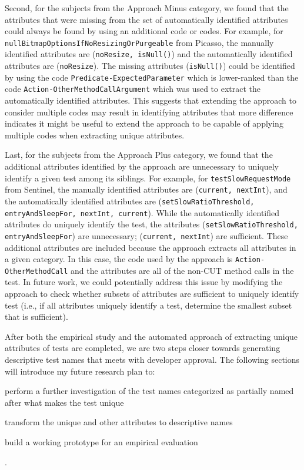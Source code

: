 Second, for the subjects from the Approach Minus category, we found that the attributes that were missing from the set of automatically identified attributes could always be found by using an additional code or codes.
%
For example, for \texttt{null\-Bitmap\-Options\-If\-No\-Resizing\-Or\-Purgeable} from Picasso, the manually identified attributes are (\texttt{no\-Resize, is\-Null()}) and the automatically identified attributes are (\texttt{no\-Resize}).
%
The missing attributes (\texttt{is\-Null()}) could be identified by using the code \texttt{Predicate-Expected\-Parameter} which is lower-ranked than the code \texttt{Action-Other\-Method\-Call\-Argument} which was used to extract the automatically identified attributes.
%
This suggests that extending the approach to consider multiple codes may result in identifying attributes that more difference indicates it might be useful to extend the approach to be capable of applying multiple codes when extracting unique attributes.


Last, for the subjects from the Approach Plus category, we found that the additional attributes identified by the approach are unnecessary to uniquely identify a given test among its siblings.
%
For example, for \texttt{test\-Slow\-Request\-Mode} from Sentinel, the manually identified attributes are (\texttt{current, next\-Int}), and the automatically identified attributes are (\texttt{set\-Slow\-Ratio\-Threshold, entry\-And\-Sleep\-For, next\-Int, current}). 
%
While the automatically identified attributes do uniquely identify the test, the attributes (\texttt{set\-Slow\-Ratio\-Threshold, entry\-And\-Sleep\-For}) are unnecessary; (\texttt{current, next\-Int}) are sufficient.
%
These additional attributes are included because the approach extracts all attributes in a given category.
%
In this case, the code used by the approach is \texttt{Action-Other\-Method\-Call} and the attributes are all of the non-CUT method calls in the test.
%
In future work, we could potentially address this issue by modifying the approach to check whether subsets of attributes are sufficient to uniquely identify test (i.e., if all attributes uniquely identify a test, determine the smallest subset that is sufficient).


After both the empirical study and the automated approach of extracting unique attributes of tests are completed, we are two steps closer towards generating descriptive test names that meets with developer approval.
%
The following sections will introduce my future research plan to:
\begin{enumerate*}
    \item perform a further investigation of the test names categorized as partially named after what makes the test unique
    \item transform the unique and other attributes to descriptive names
    \item build a working prototype for an empirical evaluation 
\end{enumerate*}.

